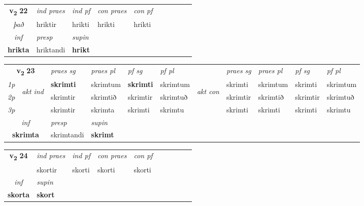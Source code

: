 \noindent
\begin{tabular}{lllllllllll} \toprule
\multicolumn{2}{c}{\textbf{v{\textsubscript{2}}} \Large{\textbf{22}}}  &  \textit{ind praes} & \textit{ind pf} & \textit{con praes} & \textit{con pf} \\*
\multicolumn{2}{c}{ \textit{það} } & hriktir & hrikti & hrikti & hrikti \\*

\cmidrule{3-4}
   \multicolumn{2}{c}{\textit{inf}}     & \textit{presp} & \textit{supin}   \\*
  \multicolumn{2}{c}{\textbf{hrikta}}      & hriktandi &  \textbf{hrikt}   \\*
\end{tabular}

\noindent
\begin{tabular}{lllllllllll} \toprule
\multicolumn{2}{c}{\textbf{v{\textsubscript{2}}} \Large{\textbf{23}}}  &  \textit{praes sg}  & \textit{praes pl}  &\textit{ pf sg} & \textit{pf pl} &  &  \textit{praes sg}  & \textit{praes pl}  & \textit{pf sg} & \textit{pf pl } \\*
	\cmidrule{3-6} \cmidrule{8-11}
 {\textit{1p}} & \multirow{3}{*}{\begin{turn}{90}\textit{akt ind}\end{turn}} & \textbf{skrimti} & skrimtum & \textbf{skrimti} & skrimtum & \multirow{3}{*}{\begin{turn}{90}\textit{akt con}\end{turn}} &skrimti & skrimtum & skrimti & skrimtum\\*
 {\textit{2p}} &  &  skrimtir  & skrimtið & skrimtir & skrimtuð & & skrimtir & skrimtið & skrimtir & skrimtuð \\*
{\textit{3p}} &  & skrimtir & skrimta & skrimti & skrimtu & & skrimti & skrimti& skrimti & skrimtu \\*
\cmidrule{3-6} \cmidrule{8-11}

   \multicolumn{2}{c}{\textit{inf}}     & \textit{presp} & \textit{supin}   \\*
  \multicolumn{2}{c}{\textbf{skrimta}}      & skrimtandi &  \textbf{skrimt}   \\*
\end{tabular}

\noindent
\begin{tabular}{lllllllllll} \toprule
\multicolumn{2}{c}{\textbf{v{\textsubscript{2}}} \Large{\textbf{24}}}  &  \textit{ind praes} & \textit{ind pf} & \textit{con praes} & \textit{con pf} \\*
\multicolumn{2}{c}{ \textit{\specialcell{e-n\\það}} } & skortir & skorti & skorti & skorti \\*

\cmidrule{3-3}
   \multicolumn{2}{c}{\textit{inf}}      & \textit{supin}   \\*
  \multicolumn{2}{c}{\textbf{skorta}}       &  \textbf{skort}   \\*
\end{tabular}

